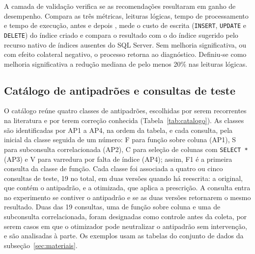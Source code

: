 A camada de validação verifica se as recomendações resultaram em ganho de desempenho. Compara as três métricas, leituras lógicas, tempo de processamento e tempo de execução, antes e depois \cite{rusanu2014perf}, mede o custo de escrita (\texttt{INSERT}, \texttt{UPDATE} e \texttt{DELETE}) do índice criado e compara o resultado com o do índice sugerido pelo recurso nativo de índices ausentes do SQL Server. Sem melhoria significativa, ou com efeito colateral negativo, o processo retorna ao diagnóstico. Definiu-se como melhoria significativa a redução mediana de pelo menos 20\% nas leituras lógicas.

\subsection{Catálogo de antipadrões e consultas de teste}\label{sec:catalogo}

O catálogo reúne quatro classes de antipadrões, escolhidas por serem recorrentes na literatura e por terem correção conhecida (Tabela~\ref{tab:catalogo}). As classes são identificadas por AP1 a AP4, na ordem da tabela, e cada consulta, pela inicial da classe seguida de um número: F para função sobre coluna (AP1), S para subconsulta correlacionada (AP2), C para seleção de colunas com \texttt{SELECT *} (AP3) e V para varredura por falta de índice (AP4); assim, F1 é a primeira consulta da classe de função. Cada classe foi associada a quatro ou cinco consultas de teste, 19 no total, em duas versões quando há reescrita: a original, que contém o antipadrão, e a otimizada, que aplica a prescrição. A consulta entra no experimento se contiver o antipadrão e se as duas versões retornarem o mesmo resultado. Duas das 19 consultas, uma de função sobre coluna e uma de subconsulta correlacionada, foram designadas como controle antes da coleta, por serem casos em que o otimizador pode neutralizar o antipadrão sem intervenção, e são analisadas à parte. Os exemplos usam as tabelas do conjunto de dados da subseção~\ref{sec:materiais}. 

